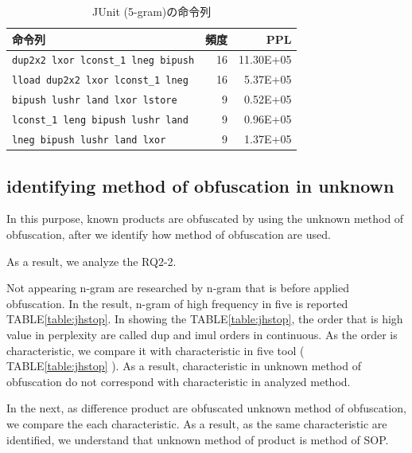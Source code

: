 \documentclass[conference]{IEEEtran}
\begin{document}
\begin{table}[t]
  \centering
  \footnotesize{
    \caption{JUnit (5-gram)の命令列}\label{table:junit}
  \begin{tabular}{l|r|r}
    命令列 & 頻度 & PPL\\ \hline
    \texttt{dup2x2 lxor lconst\_1 lneg bipush}   & 16 & 11.30E+05 \\
    \texttt{lload dup2x2 lxor lconst\_1 lneg}    & 16 &   5.37E+05 \\
    \texttt{bipush lushr land lxor lstore}       &  9 &   0.52E+05 \\
    \texttt{lconst\_1 leng bipush lushr land}    &  9 &   0.96E+05 \\
    \texttt{lneg bipush lushr land lxor}         &  9 &  1.37E+05 \\
  \end{tabular}}
\end{table}

\subsection{identifying method of obfuscation in unknown}

In this purpose, known products are obfuscated by using the unknown
method of obfuscation, after we identify how method of obfuscation are
used.

As a result, we analyze the RQ2-2.

Not appearing n-gram are researched by n-gram that is before applied
obfuscation.  In the result, n-gram of high frequency in five is
reported TABLE\ref{table:jhstop}.  In showing the
TABLE\ref{table:jhstop}, the order that is high value in perplexity
are called dup and imul orders in continuous.  As the order is
characteristic, we compare it with characteristic in five tool (
TABLE\ref{table:jhstop} ).  As a result, characteristic in unknown
method of obfuscation do not correspond with characteristic in
analyzed method.

In the next, as difference product are obfuscated unknown method of
obfuscation, we compare the each characteristic.  As a result, as the
same characteristic are identified, we understand that unknown method
of product is method of SOP.
\end{document}
